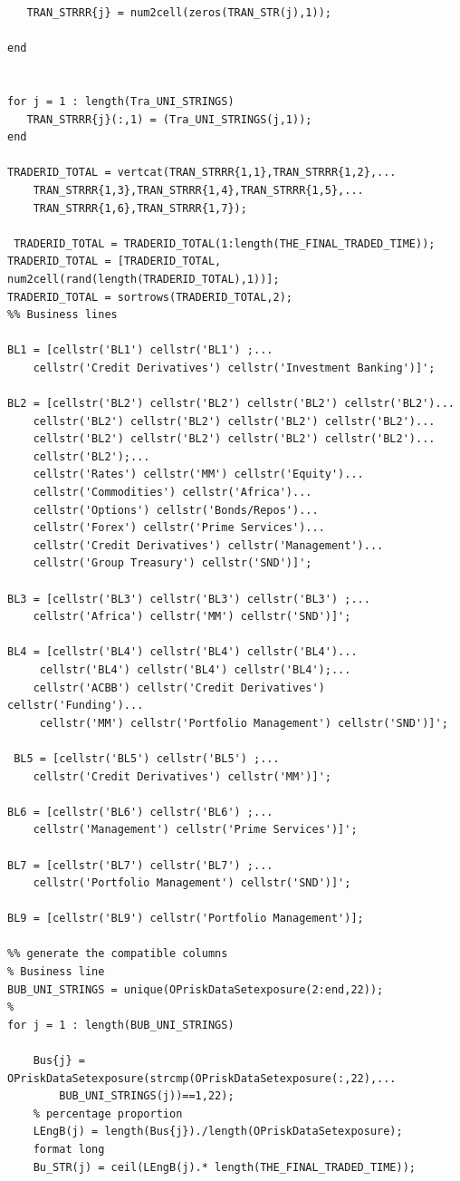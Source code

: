 \documentclass{DissertateUSU}
\begin{document}
\begin{verbatim}
   TRAN_STRRR{j} = num2cell(zeros(TRAN_STR(j),1));
   
end


for j = 1 : length(Tra_UNI_STRINGS)
   TRAN_STRRR{j}(:,1) = (Tra_UNI_STRINGS(j,1));
end

TRADERID_TOTAL = vertcat(TRAN_STRRR{1,1},TRAN_STRRR{1,2},...
    TRAN_STRRR{1,3},TRAN_STRRR{1,4},TRAN_STRRR{1,5},...
    TRAN_STRRR{1,6},TRAN_STRRR{1,7});

 TRADERID_TOTAL = TRADERID_TOTAL(1:length(THE_FINAL_TRADED_TIME));
TRADERID_TOTAL = [TRADERID_TOTAL, num2cell(rand(length(TRADERID_TOTAL),1))];
TRADERID_TOTAL = sortrows(TRADERID_TOTAL,2);
%% Business lines

BL1 = [cellstr('BL1') cellstr('BL1') ;...
    cellstr('Credit Derivatives') cellstr('Investment Banking')]';

BL2 = [cellstr('BL2') cellstr('BL2') cellstr('BL2') cellstr('BL2')...
    cellstr('BL2') cellstr('BL2') cellstr('BL2') cellstr('BL2')...
    cellstr('BL2') cellstr('BL2') cellstr('BL2') cellstr('BL2')...
    cellstr('BL2');...
    cellstr('Rates') cellstr('MM') cellstr('Equity')...
    cellstr('Commodities') cellstr('Africa')...
    cellstr('Options') cellstr('Bonds/Repos')...
    cellstr('Forex') cellstr('Prime Services')...
    cellstr('Credit Derivatives') cellstr('Management')...
    cellstr('Group Treasury') cellstr('SND')]';

BL3 = [cellstr('BL3') cellstr('BL3') cellstr('BL3') ;...
    cellstr('Africa') cellstr('MM') cellstr('SND')]';

BL4 = [cellstr('BL4') cellstr('BL4') cellstr('BL4')...
     cellstr('BL4') cellstr('BL4') cellstr('BL4');...
    cellstr('ACBB') cellstr('Credit Derivatives') cellstr('Funding')...
     cellstr('MM') cellstr('Portfolio Management') cellstr('SND')]';
 
 BL5 = [cellstr('BL5') cellstr('BL5') ;...
    cellstr('Credit Derivatives') cellstr('MM')]';

BL6 = [cellstr('BL6') cellstr('BL6') ;...
    cellstr('Management') cellstr('Prime Services')]';

BL7 = [cellstr('BL7') cellstr('BL7') ;...
    cellstr('Portfolio Management') cellstr('SND')]';

BL9 = [cellstr('BL9') cellstr('Portfolio Management')];

%% generate the compatible columns
% Business line
BUB_UNI_STRINGS = unique(OPriskDataSetexposure(2:end,22));
%
for j = 1 : length(BUB_UNI_STRINGS)
    
    Bus{j} = OPriskDataSetexposure(strcmp(OPriskDataSetexposure(:,22),...
        BUB_UNI_STRINGS(j))==1,22);
    % percentage proportion
    LEngB(j) = length(Bus{j})./length(OPriskDataSetexposure);
    format long
    Bu_STR(j) = ceil(LEngB(j).* length(THE_FINAL_TRADED_TIME));
    

\end{verbatim}
\end{document}

